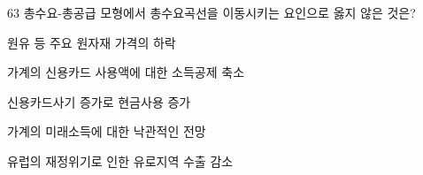 \begin{question}{63}
총수요-총공급 모형에서 총수요곡선을 이동시키는 요인으로 옳지 않은 것은?
\begin{choices}
  \item 원유 등 주요 원자재 가격의 하락
  \item 가계의 신용카드 사용액에 대한 소득공제 축소
  \item 신용카드사기 증가로 현금사용 증가
  \item 가계의 미래소득에 대한 낙관적인 전망
  \item 유럽의 재정위기로 인한 유로지역 수출 감소
\end{choices}
\end{question}
